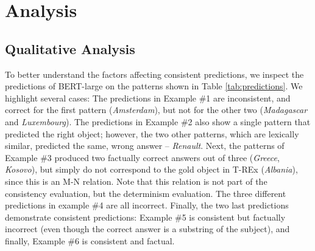 \section{Analysis}
\label{sec:analysis}





\subsection{Qualitative Analysis}
To better understand the factors affecting consistent
predictions, we inspect the predictions of BERT-large on the
patterns shown  in Table \ref{tab:predictions}.
We highlight several cases:
The predictions in Example \#1 are inconsistent, and correct for the first pattern (\textit{Amsterdam}), but not for the other two (\textit{Madagascar} and \textit{Luxembourg}). 
The predictions in Example \#2 also show a single pattern that predicted the right object; however, the two other patterns, which are lexically similar, predicted the same, wrong answer -- \textit{Renault}.
Next, the patterns of Example \#3
produced two factually correct answers out of three (\textit{Greece}, \textit{Kosovo}), but simply do not correspond to the gold
object in T-REx (\textit{Albania}), since this is an M-N relation. Note that this relation is not part of the consistency evaluation, but the determinism evaluation.
The three different predictions in example \#4 are all incorrect.
Finally, the two last predictions demonstrate consistent predictions:
Example \#5 is consistent but factually incorrect (even though the correct answer is a substring of the subject), and finally, Example \#6
is consistent and factual.





